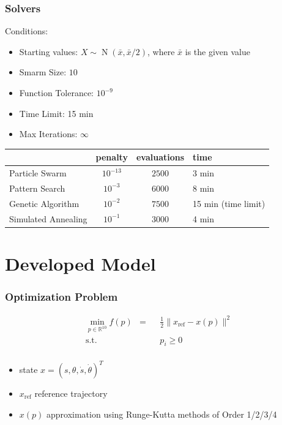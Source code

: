 \documentclass{beamer}
\begin{document}
\begin{frame}
	\frametitle{Solvers}
	Conditions:
	\begin{itemize}
		\item{Starting values: $X\sim \operatorname{N}\left(\bar{x},\bar{x}/2\right)$, where $\bar{x}$ is the given value}
		\item{Smarm Size: $10$}
		\item{Function Tolerance: $10^{-9}$}
		\item{Time Limit: 15 min}
		\item{Max Iterations: $\infty$}
	\end{itemize}
	
	 \vspace{0.5cm}
	
	\begin{tabular}{l|ccl}
		& penalty & evaluations & time \\
		\hline
		Particle Swarm & $10^{-13}$ & $2500$ & 3 min \\
		Pattern Search & $10^{-3}$ & $6000$ & 8 min \\
		Genetic Algorithm & $10^{-2}$ & $7500$ & 15 min (time limit) \\
		Simulated Annealing & $10^{-1}$ & $3000$ & 4 min \\
	\end{tabular}
\end{frame}




\section{Developed Model}

\begin{frame}
    \frametitle{Optimization Problem}
    \begin{align*}
        \min_{p\in\mathbb{R}^{10}} f(p) & = & & \frac{1}{2} \| x_{\text{ref}} - x(p) \|^2 \\
        \operatorname{s.t.} & & & p_i \geq 0 \\
    \end{align*}

    \begin{itemize}
        \item{state $x = (s,\theta,\dot{s},\dot{\theta})^T$}
        \item{$x_{\text{ref}}$ reference trajectory}
        \item{$x(p)$ approximation using Runge-Kutta methods of Order 1/2/3/4}
    \end{itemize}
\end{frame}
\end{document}
